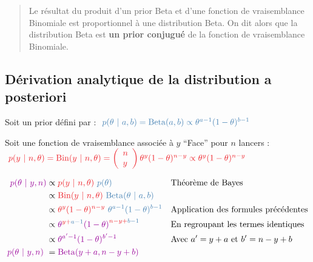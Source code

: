 \documentclass[
  a4paper,11pt,twoside,onecolumn,openright,final,oldfontcommands]{memoir}
\theoremstyle{definition}
\theoremstyle{definition}
\theoremstyle{definition}
\theoremstyle{remark}
\begin{document}
\begin{quote}
Le résultat du produit d'un prior Beta et d'une fonction de vraisemblance Binomiale est proportionnel à une distribution Beta. On dit alors que la distribution Beta est \textbf{un prior conjugué} de la fonction de vraisemblance Binomiale.
\end{quote}

\hypertarget{duxe9rivation-analytique-de-la-distribution-a-posteriori}{%
\subsection{Dérivation analytique de la distribution a posteriori}\label{duxe9rivation-analytique-de-la-distribution-a-posteriori}}

Soit un prior défini par : \(\ \color{steelblue}{p(\theta \ | \ a, b) = \mathrm{Beta}(a, b) \propto \theta^{a - 1}(1 - \theta)^{b - 1}}\)

Soit une fonction de vraisemblance associée à \(y\) ``Face'' pour \(n\) lancers : \(\ \color{orangered}{p(y \ | \ n, \theta) = \mathrm{Bin}(y \ | \ n, \theta) = \left(\begin{array}{l} n \\ y \end{array}\right) \theta^{y}(1 - \theta)^{n - y} \propto \theta^{y}(1 - \theta)^{n - y}}\)

\[
\begin{aligned}
\color{purple}{p(\theta \ | \ y, n)} &\propto \color{orangered}{p(y \ | \ n, \theta)} \ \color{steelblue}{p(\theta)} &&\mbox{Théorème de Bayes} \\
&\propto \color{orangered}{\mathrm{Bin}(y \ | \ n, \theta)} \ \color{steelblue}{\mathrm{Beta}(\theta \ | \ a, b)} \\
&\propto \color{orangered}{\theta^{y}(1 - \theta)^{n - y}} \ \color{steelblue}{\theta^{a - 1}(1 - \theta)^{b - 1}} &&\mbox{Application des formules précédentes} \\
&\propto \color{purple}{\theta}^{\color{orangered}{y} + \color{steelblue}{a - 1}}\color{purple}{(1 - \theta)}^{\color{orangered}{n - y} + \color{steelblue}{b - 1}} &&\mbox{En regroupant les termes identiques} \\
&\propto \color{purple}{\theta^{a' - 1}(1 - \theta)^{b' - 1}} &&\mbox{Avec } a' = y + a \mbox{ et } b' = n - y + b \\
\color{purple}{p(\theta \ | \ y, n)} \ &= \color{purple}{\mathrm{Beta}(y + a, n - y + b)}
\end{aligned}
\]
\end{document}
